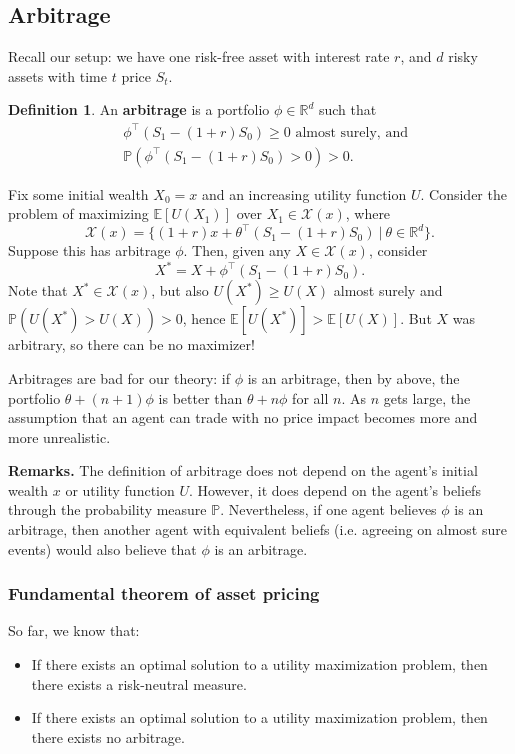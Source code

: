 \documentclass{article}
\theoremstyle{definition}
\newtheorem{defn}{Definition}[section]
\begin{document}
\subsection{Arbitrage}

Recall our setup: we have one risk-free asset with interest rate $r$, and $d$ risky assets with time $t$ price $S_t$.

\begin{defn}
    An \textbf{arbitrage} is a portfolio $\phi \in \mathbb{R}^d$ such that
    \begin{align*}
        &\phi^\top(S_1-(1+r)S_0) \ge 0 \text{ almost surely, and} \\
        &\mathbb{P}(\phi^\top(S_1-(1+r)S_0)>0)>0.    
    \end{align*}
\end{defn}

Fix some initial wealth $X_0=x$ and an increasing utility function $U$. Consider the problem of maximizing $\mathbb{E}[U(X_1)]$ over $X_1 \in \mathcal{X}(x)$, where $$\mathcal{X}(x) = \{(1+r)x + \theta^\top(S_1-(1+r)S_0) ~|~ \theta \in \mathbb{R}^d\}.$$
Suppose this has arbitrage $\phi$. Then, given any $X \in \mathcal{X}(x)$, consider $$X^* = X + \phi^\top(S_1-(1+r)S_0).$$ Note that $X^* \in \mathcal{X}(x)$, but also $U(X^*)\ge U(X)$ almost surely and $\mathbb{P}(U(X^*)>U(X))>0$, hence $\mathbb{E}[U(X^*)] > \mathbb{E}[U(X)]$. But $X$ was arbitrary, so there can be no maximizer!
\vspace{1mm}

Arbitrages are bad for our theory: if $\phi$ is an arbitrage, then by above, the portfolio $\theta + (n+1)\phi$ is better than $\theta+n \phi$ for all $n$. As $n$ gets large, the assumption that an agent can trade with no price impact becomes more and more unrealistic.

\textbf{Remarks.} The definition of arbitrage does not depend on the agent's initial wealth $x$ or utility function $U$. However, it does depend on the agent's beliefs through the probability measure $\mathbb{P}$. Nevertheless, if one agent believes $\phi$ is an arbitrage, then another agent with equivalent beliefs (i.e. agreeing on almost sure events) would also believe that $\phi$ is an arbitrage.

\subsubsection{Fundamental theorem of asset pricing}
So far, we know that:
\begin{itemize}
    \item If there exists an optimal solution to a utility maximization problem, then there exists a risk-neutral measure. 
    \item If there exists an optimal solution to a utility maximization problem, then there exists no arbitrage.
\end{itemize} 
    
\end{document}
